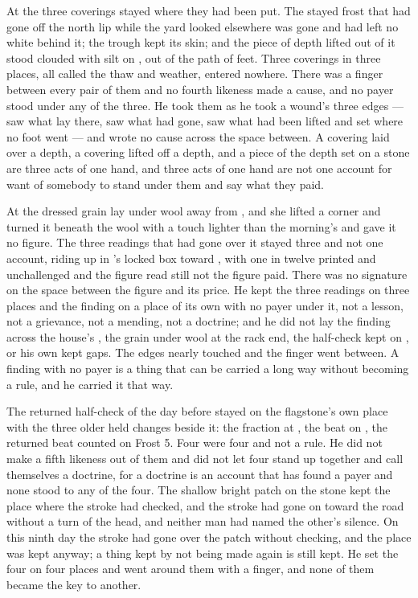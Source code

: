 At  the three coverings stayed where they had been put. The stayed frost that had gone off the north lip while the yard looked elsewhere was gone and had left no white behind it; the trough kept its skin; and the piece of depth lifted out of it stood clouded with silt on , out of the path of feet. Three coverings in three places, all called the thaw and weather, entered nowhere. There was a finger between every pair of them and no fourth likeness made a cause, and no payer stood under any of the three. He took them as he took a wound's three edges --- saw what lay there, saw what had gone, saw what had been lifted and set where no foot went --- and wrote no cause across the space between. A covering laid over a depth, a covering lifted off a depth, and a piece of the depth set on a stone are three acts of one hand, and three acts of one hand are not one account for want of somebody to stand under them and say what they paid.

\scenebreak

At  the dressed grain lay under wool away from , and she lifted a corner and turned it beneath the wool with a touch lighter than the morning's and gave it no figure. The three readings that had gone over it stayed three and not one account, riding up  in 's locked box toward , with one in twelve printed and unchallenged and the figure read still not the figure paid. There was no signature on the space between the figure and its price. He kept the three readings on three places and the finding on a place of its own with no payer under it, not a lesson, not a grievance, not a mending, not a doctrine; and he did not lay the finding across the house's , the grain under wool at the rack end, the half-check kept on , or his own kept gaps. The edges nearly touched and the finger went between. A finding with no payer is a thing that can be carried a long way without becoming a rule, and he carried it that way.

The returned half-check of the day before stayed on the flagstone's own place with the three older held changes beside it: the fraction at , the beat on , the returned beat counted on Frost 5. Four were four and not a rule. He did not make a fifth likeness out of them and did not let four stand up together and call themselves a doctrine, for a doctrine is an account that has found a payer and none stood to any of the four. The shallow bright patch on the stone kept the place where the stroke had checked, and the stroke had gone on toward the road without a turn of the head, and neither man had named the other's silence. On this ninth day the stroke had gone over the patch without checking, and the place was kept anyway; a thing kept by not being made again is still kept. He set the four on four places and went around them with a finger, and none of them became the key to another.

